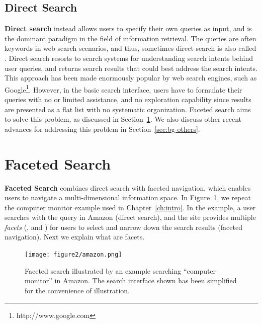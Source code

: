 \subsection{Direct Search}
\textbf{Direct search} instead allows users to specify their own queries as input, and is the dominant paradigm in the field of information retrieval. The queries are often keywords in web search scenarios, and thus, sometimes direct search is also called . Direct search resorts to search systems for understanding search intents behind user queries, and returns search results that could best address the search intents. This approach has been made enormously popular by web search engines, such as Google\footnote{http://www.google.com}. However, in the basic search interface, users have to formulate their queries with no or limited assistance, and no exploration capability since results are presented as a flat list with no systematic organization. Faceted search aims to solve this problem, as discussed in Section~\ref{sec:bg-fs}. We also discuss other recent advances for addressing this problem in Section~\ref{sec:bg-others}.


\section{Faceted Search}
\label{sec:bg-fs}
\textbf{Faceted Search} combines direct search with faceted navigation, which enables users to navigate a multi-dimensional information space. In Figure~\ref{fig:bg-amazon}, we repeat the computer monitor example used in Chapter~\ref{ch:intro}. In the example, a user searches with the query  in Amazon (direct search), and the site provides multiple \textit{facets} (,  and ) for users to select and narrow down the search results (faceted navigation). Next we explain what are facets.
\begin{figure}[!ht]
\centering
\texttt{[image: figure2/amazon.png]}
\caption{Faceted search illustrated by an example searching ``computer monitor'' in Amazon. The search interface shown has been simplified for the convenience of illustration.}
\label{fig:bg-amazon}
\end{figure}

